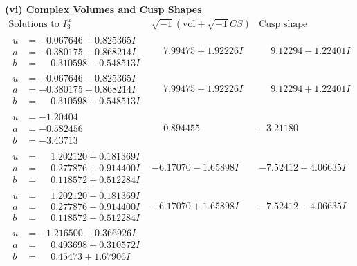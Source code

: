 \documentclass[1p]{elsarticle_modified}
\theoremstyle{definition}
\newcommand{\I}{\sqrt{-1}}
\begin{document}
\newpage\flushleft \textbf{(vi) Complex Volumes and Cusp Shapes}
$$\begin{array}{c|c|c}  
\text{Solutions to }I^u_{3}& \I (\text{vol} + \sqrt{-1}CS) & \text{Cusp shape}\\
 \hline 
\begin{aligned}
u &= -0.067646 + 0.825365 I \\
a &= -0.380175 - 0.868214 I \\
b &= \phantom{-}0.310598 - 0.548513 I\end{aligned}
 & \phantom{-}7.99475 + 1.92226 I & \phantom{-}9.12294 - 1.22401 I \\ \hline\begin{aligned}
u &= -0.067646 - 0.825365 I \\
a &= -0.380175 + 0.868214 I \\
b &= \phantom{-}0.310598 + 0.548513 I\end{aligned}
 & \phantom{-}7.99475 - 1.92226 I & \phantom{-}9.12294 + 1.22401 I \\ \hline\begin{aligned}
u &= -1.20404\phantom{ +0.000000I} \\
a &= -0.582456\phantom{ +0.000000I} \\
b &= -3.43713\phantom{ +0.000000I}\end{aligned}
 & \phantom{-}0.894455\phantom{ +0.000000I} & -3.21180\phantom{ +0.000000I} \\ \hline\begin{aligned}
u &= \phantom{-}1.202120 + 0.181369 I \\
a &= \phantom{-}0.277876 + 0.914400 I \\
b &= \phantom{-}0.118572 + 0.512284 I\end{aligned}
 & -6.17070 - 1.65898 I & -7.52412 + 4.06635 I \\ \hline\begin{aligned}
u &= \phantom{-}1.202120 - 0.181369 I \\
a &= \phantom{-}0.277876 - 0.914400 I \\
b &= \phantom{-}0.118572 - 0.512284 I\end{aligned}
 & -6.17070 + 1.65898 I & -7.52412 - 4.06635 I \\ \hline\begin{aligned}
u &= -1.216500 + 0.366926 I \\
a &= \phantom{-}0.493698 + 0.310572 I \\
b &= \phantom{-}0.45473 + 1.67906 I\end{aligned}

\end{array}$$
\end{document}
